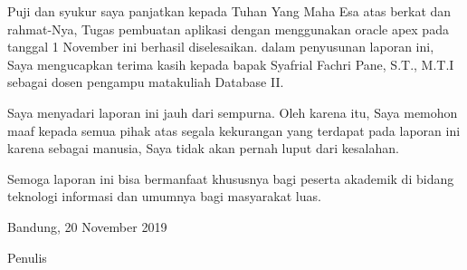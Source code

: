 \begin{acknowledgements}
Puji dan syukur saya panjatkan kepada Tuhan Yang Maha Esa atas berkat dan rahmat-Nya, Tugas pembuatan aplikasi dengan menggunakan oracle apex pada tanggal 1 November ini berhasil diselesaikan. dalam penyusunan laporan ini, Saya mengucapkan terima kasih kepada bapak Syafrial Fachri Pane, S.T., M.T.I sebagai dosen pengampu matakuliah Database II.

Saya menyadari laporan ini jauh dari sempurna. Oleh karena itu, Saya memohon maaf kepada semua pihak atas segala kekurangan yang terdapat pada laporan ini karena sebagai manusia, Saya tidak akan pernah luput dari kesalahan. 

Semoga laporan ini bisa bermanfaat khususnya bagi peserta akademik di bidang teknologi informasi dan umumnya bagi masyarakat luas. 

\begin{raggedleft}

Bandung, 20 November 2019

Penulis

\end{raggedleft}

\end{acknowledgements}